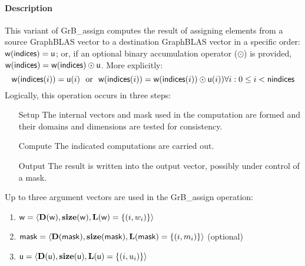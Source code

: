 \paragraph{Description}

This variant of {\sf GrB\_assign} computes the result of assigning elements from 
a source GraphBLAS vector to a destination GraphBLAS vector in a specific order: 
${\sf w}({\sf indices}) = {\sf u}$; or, if an optional binary accumulation 
operator ($\odot$) is provided, 
${\sf w}({\sf indices}) = {\sf w}({\sf indices}) \odot {\sf u}$.  
More explicitly:
\[
	{\sf w}({\sf indices}(i)) = {\sf u}(i) \mbox{~~or~~} 
    {\sf w}({\sf indices}(i)) = {\sf w}({\sf indices}(i)) \odot {\sf u}(i))
    \forall i : 0 \leq i < {\sf nindices}
\]  
Logically, this operation occurs in three steps:
\begin{enumerate}[leftmargin=0.75in]
\item[Setup] The internal vectors and mask used in the computation are formed 
and their domains and dimensions are tested for consistency.
\item[Compute] The indicated computations are carried out.
\item[Output] The result is written into the output vector, possibly under 
control of a mask.
\end{enumerate}

Up to three argument vectors are used in the {\sf GrB\_assign} operation:
\begin{enumerate}
	\item ${\sf w} = \langle \bold{D}({\sf w}),\bold{size}({\sf w}),
    \bold{L}({\sf w}) = \{(i,w_i) \} \rangle$
    
	\item ${\sf mask} = \langle \bold{D}({\sf mask}),\bold{size}({\sf mask}),
    \bold{L}({\sf mask}) = \{(i,m_i) \} \rangle$ (optional)
    
	\item ${\sf u} = \langle \bold{D}({\sf u}),\bold{size}({\sf u}),
    \bold{L}({\sf u}) = \{(i,u_i) \} \rangle$
\end{enumerate}

